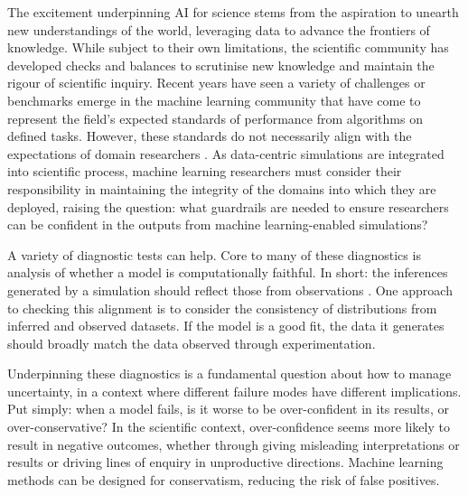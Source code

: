 The excitement underpinning AI for science stems from the aspiration to
unearth new understandings of the world, leveraging data to advance the
frontiers of knowledge. While subject to their own limitations, the
scientific community has developed checks and balances to scrutinise new
knowledge and maintain the rigour of scientific inquiry. Recent years
have seen a variety of challenges or benchmarks emerge in the machine
learning community that have come to represent the field's expected
standards of performance from algorithms on defined tasks. However,
these standards do not necessarily align with the expectations of domain
researchers \citep{Hermans-averting21}.
As data-centric simulations are integrated into scientific process,
machine learning researchers must consider their responsibility in
maintaining the integrity of the domains into which they are deployed,
raising the question: what guardrails are needed to ensure researchers
can be confident in the outputs from machine learning-enabled
simulations?

A variety of diagnostic tests can help. Core to many of these
diagnostics is analysis of whether a model is computationally faithful.
In short: the inferences generated by a simulation should reflect those
from observations \citep{Hermans-averting21}. One approach to checking this
alignment is to consider the consistency of distributions from inferred
and observed datasets. If the model is a good fit, the data it generates
should broadly match the data observed through experimentation.

Underpinning these diagnostics is a fundamental question about how to
manage uncertainty, in a context where different failure modes have
different implications. Put simply: when a model fails, is it worse to
be over-confident in its results, or over-conservative? In the
scientific context, over-confidence seems more likely to result in
negative outcomes, whether through giving misleading interpretations or
results or driving lines of enquiry in unproductive directions. Machine
learning methods can be designed for conservatism, reducing the risk of
false positives.

